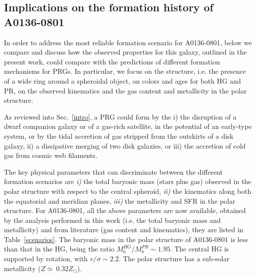 \documentclass[useAMS,usenatbib]{mn2e}
\begin{document}
\subsection{Implications on the formation history of A0136-0801}

In order to address the most reliable formation scenario for
A0136-0801, below we compare and discuss how the observed properties
for this galaxy, outlined in the present work, could compare with the
predictions of different formation mechanisms for PRGs.  In
particular, we focus on the structure, i.e. the presence of a wide
ring around a spheroidal object, on colors and ages for both HG and
PR, on the observed kinematics and the gas content and metallicity in
the polar structure.

As reviewed into Sec.~\ref{intro}, a PRG could form by the i) the
disruption of a dwarf companion galaxy or of a gas-rich satellite, in
the potential of an early-type system, or by the tidal accretion of
gas stripped from the outskirts of a disk galaxy, ii) a dissipative
merging of two disk galaxies, or iii) the accretion of cold gas from
cosmic web filaments.

The key physical parameters that can discriminate between the
different formation scenarios are {\it i)} the total baryonic mass
(stars plus gas) observed in the polar structure with respect to the
central spheroid, {\it ii)} the kinematics along both the equatorial
and meridian planes, {\it iii)} the metallicity and SFR in the polar
structure. For A0136-0801, all the above parameters are now available,
obtained by the analysis performed in this work (i.e. the total
baryonic mass and metallicity) and from literature (gas content and
kinematics), they are listed in Table~\ref{scenarios}.  The baryonic
mass in the polar structure of A0136-0801 is less than that in the HG,
being the ratio $M_{b}^{HG}/M_{b}^{PR} \sim 1.95$. The central HG is
supported by rotation, with $v/ \sigma \sim 2.2$. The polar structure
has a sub-solar metallicity ($Z \simeq\ 0.32 Z_{\odot}$).
\end{document}
